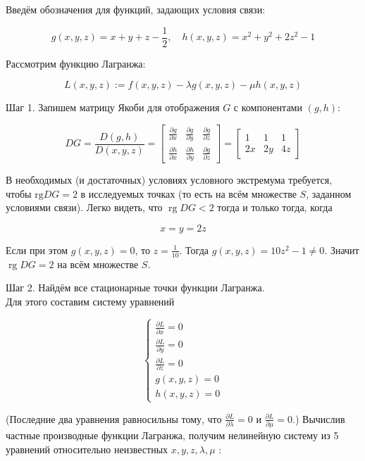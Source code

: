 \documentclass[a4paper,12pt]{article} %
\begin{document}
Введём обозначения для функций, задающих условия связи:

$$
g(x, y, z)=x+y+z-\frac{1}{2}, \quad h(x, y, z)=x^{2}+y^{2}+2 z^{2}-1
$$

Рассмотрим функцию Лагранжа:

$$
L(x, y, z):=f(x, y, z)-\lambda g(x, y, z)-\mu h(x, y, z)
$$

Шаг 1. Запишем матрицу Якоби для отображения $G$ с компонентами $(g, h):$

$$
D G=\frac{D(g, h)}{D(x, y, z)}=\left[\begin{array}{lll}
\frac{\partial g}{\partial x} & \frac{\partial g}{\partial y} & \frac{\partial g}{\partial z} \\
\frac{\partial h}{\partial x} & \frac{\partial h}{\partial y} & \frac{\partial g}{\partial z}
\end{array}\right]=\left[\begin{array}{ccc}
1 & 1 & 1 \\
2 x & 2 y & 4 z
\end{array}\right]
$$

В необходимых (и достаточных) условиях условного экстремума требуется, чтобы $\mathrm{rg} D G=2$ в исследуемых точках (то есть на всём множестве $S$, заданном условиями связи). Легко видеть, что $\operatorname{rg} D G<2$ тогда и только тогда, когда

$$
x=y=2 z
$$

Если при этом $g(x, y, z)=0$, то $z=\frac{1}{10}$. Тогда $g(x, y, z)=10 z^{2}-1 \neq 0$. Значит $\operatorname{rg} D G=2$ на всём множестве $S$.

Шаг 2. Найдём все стационарные точки функции Лагранжа.\\
 Для этого составим систему уравнений

$$
\left\{\begin{array}{l}
\frac{\partial L}{\partial x}=0 \\
\frac{\partial L}{\partial y}=0 \\
\frac{\partial L}{\partial z}=0 \\
g(x, y, z)=0 \\
h(x, y, z)=0
\end{array}\right.
$$

(Последние два уравнения равносильны тому, что $\frac{\partial L}{\partial \lambda}=0$ и $\frac{\partial L}{\partial \mu}=0$.) Вычислив частные производные функции Лагранжа, получим нелинейную систему из 5 уравнений относительно неизвестных $x, y, z, \lambda, \mu$ :
\end{document}
